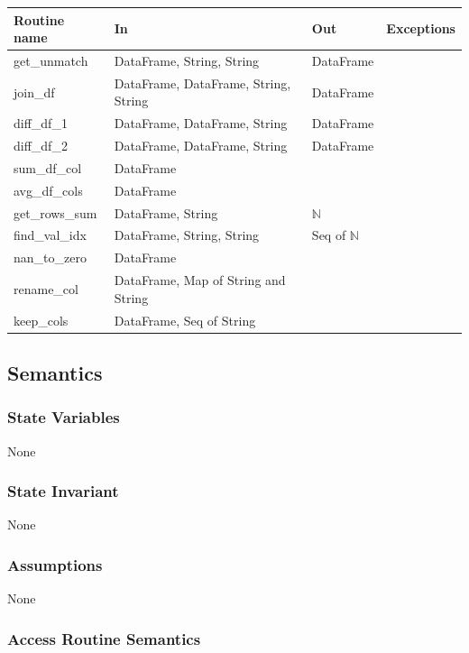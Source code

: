 \documentclass[12pt]{article}
\begin{document}
\begin{tabular}{| l | l | l | p{5cm} |}
\hline
\textbf{Routine name} & \textbf{In} & \textbf{Out} & \textbf{Exceptions}\\
\hline
get\_unmatch & DataFrame, String, String & DataFrame & \\
\hline
join\_df & DataFrame, DataFrame, String, String & DataFrame & \\
\hline
diff\_df\_1 & DataFrame, DataFrame, String & DataFrame & \\
\hline
diff\_df\_2 & DataFrame, DataFrame, String & DataFrame & \\
\hline
sum\_df\_col & DataFrame & & \\
\hline
avg\_df\_cols & DataFrame &  & \\
\hline
get\_rows\_sum & DataFrame, String & $\mathbb{N}$ & \\
\hline
find\_val\_idx & DataFrame, String, String & Seq of $\mathbb{N}$ & \\
\hline
nan\_to\_zero & DataFrame&  & \\
\hline
rename\_col & DataFrame, Map of String and String &  & \\
\hline
keep\_cols & DataFrame, Seq of String &  & \\
\hline

\end{tabular}

\subsection* {Semantics}

\subsubsection* {State Variables}

None

\subsubsection* {State Invariant}

None

\subsubsection* {Assumptions}

None

\subsubsection* {Access Routine Semantics}
\end{document}

